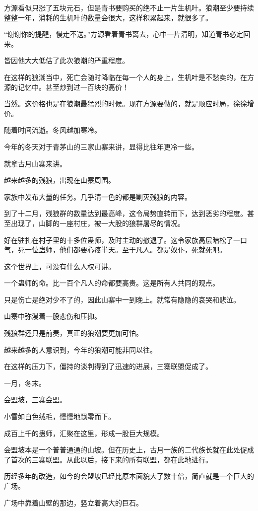 \begin{this_body}
方源看似只涨了五块元石，但是青书要购买的绝不止一片生机叶。狼潮至少要持续整整一年，消耗的生机叶的数量会很大，这样积累起来，就很多了。

“谢谢你的提醒，慢走不送。”方源看着青书离去，心中一片清明，知道青书必定回来。

皆因他大大低估了此次狼潮的严重程度。

在这样的狼潮当中，死亡会随时降临在每一个人的身上，生机叶是不愁卖的，在方源的记忆中。甚至炒到过一百块的高价！

当然。这价格也是在狼潮最猛烈的时候。现在方源要做的，就是顺应时局，徐徐增价。

随着时间流逝。冬风越加寒冷。

今年的冬天对于青茅山的三家山寨来讲，显得比往年更冷一些。

就拿古月山寨来讲。

越来越多的残狼，出现在山寨周围。

家族中发布大量的任务。几乎清一色的都是剿灭残狼的内容。

到了十二月，残狼群的数量达到最高峰，这令局势直转而下，达到恶劣的程度。甚至出现了，山脚的一座村庄，被一大股的狼群屠尽的情况。

好在驻扎在村子里的十多位蛊师，及时主动的撤退了。这令家族高层暗松了一口气，死一位蛊师，他们都要心疼半天。至于凡人。都是奴仆，死就死吧。

这个世界上，可没有什么人权可讲。

一个蛊师的命。比一百个凡人的命都要高贵。这是所有人共同的观点。

只是伤亡是绝对少不了的，因此山寨中一到晚上。就常有隐隐的哀哭和悲泣。

山寨中弥漫着一股悲伤和压抑。

残狼群还只是前奏，真正的狼潮要更加可怕。

越来越多的人意识到，今年的狼潮可能非同以往。

在这样的压力下，僵持的谈判得到了迅速的进展，三寨联盟促成了。

一月，冬末。

会盟坡，三寨会盟。

小雪如白色绒毛，慢慢地飘零而下。

成百上千的蛊师，汇聚在这里，形成一股巨大规模。

会盟坡本是一个普普通通的山坡。但在历史上，古月一族的二代族长就在此处促成了首次的三寨联盟。从此以后，接下来的所有联盟，都在此地进行。

历经多年的改造，如今的会盟坡已经比原本面貌大了数十倍，简直就是一个巨大的广场。

广场中靠着山壁的那边，竖立着高大的巨石。


\end{this_body}
